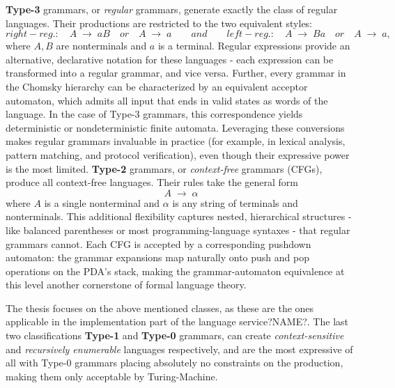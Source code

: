 \textbf{Type-3} grammars, or \emph{regular} grammars, generate exactly the class of regular languages. Their productions are restricted to the two equivalent styles:
\[
  right-reg.: \quad A \;\to\; aB \quad or \quad A \;\to\; a
  \qquad and \qquad
  left-reg.: \quad A \;\to\; Ba \quad or \quad A \;\to\; a,
\]
where \(A,B\) are nonterminals and \(a\) is a terminal. Regular expressions provide an alternative, declarative notation for these languages - each expression
can be transformed into a regular grammar, and vice versa. Further, every grammar in the Chomsky hierarchy can be characterized by an equivalent acceptor automaton, which admits all input that ends in valid states as words of the language.
In the case of Type-3 grammars, this correspondence yields deterministic or nondeterministic finite automata. Leveraging these conversions makes regular grammars
invaluable in practice (for example, in lexical analysis, pattern matching, and protocol verification), even though their expressive power is the most limited.
\textbf{Type-2} grammars, or \emph{context-free} grammars (CFGs), produce all context-free languages.
Their rules take the general form  \[A \;\to\; \alpha\] where \(A\) is a single nonterminal and \(\alpha\) is any string of terminals and nonterminals.
This additional flexibility captures nested, hierarchical structures - like balanced parentheses or most programming-language syntaxes - that regular grammars cannot.
Each CFG is accepted by a corresponding pushdown automaton: the grammar expansions map naturally onto push and pop operations on the PDA's stack, making the grammar-automaton
equivalence at this level another cornerstone of formal language theory.

The thesis focuses on the above mentioned classes, as these are the ones applicable in the implementation part of the language service?NAME?. The last two classifications
\textbf{Type-1} and \textbf{Type-0} grammars, can create \textit{context-sensitive} and \textit{recursively enumerable} languages respectively, and are the most expressive
of all with Type-0 grammars placing absolutely no constraints on the production, making them only acceptable by Turing-Machine.

